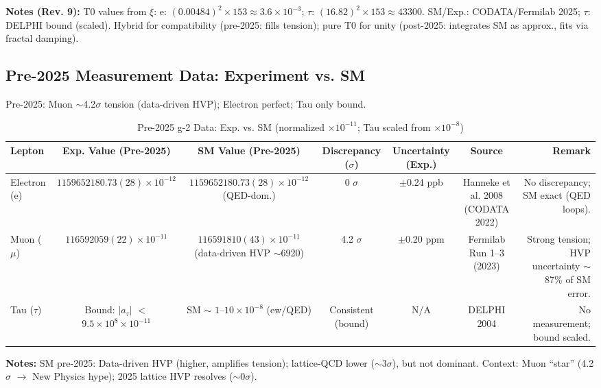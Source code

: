 \documentclass[12pt,a4paper]{article}
\theoremstyle{definition}
\begin{document}
	\textbf{Notes (Rev. 9):} T0 values from $\xi$: e: $(0.00484)^2 \times 153 \approx 3.6 \times 10^{-3}$; $\tau$: $(16.82)^2 \times 153 \approx 43300$. SM/Exp.: CODATA/Fermilab 2025; $\tau$: DELPHI bound (scaled). Hybrid for compatibility (pre-2025: fills tension); pure T0 for unity (post-2025: integrates SM as approx., fits via fractal damping).
	
	\subsection{Pre-2025 Measurement Data: Experiment vs. SM}
	
	Pre-2025: Muon $\sim$4.2$\sigma$ tension (data-driven HVP); Electron perfect; Tau only bound.
	
	\begin{table}[ht!]
		\centering
		\small
		\begin{adjustbox}{max width=\textwidth}
			\begin{tabular}{@{}lcccccr@{}}
				\toprule
				Lepton & Exp. Value (Pre-2025) & SM Value (Pre-2025) & Discrepancy ($\sigma$) & Uncertainty (Exp.) & Source & Remark \\
				\midrule
				Electron (e) & $1159652180.73(28) \times 10^{-12}$ & $1159652180.73(28) \times 10^{-12}$ (QED-dom.) & 0 $\sigma$ & $\pm$0.24 ppb & Hanneke et al. 2008 (CODATA 2022) & No discrepancy; SM exact (QED loops). \\
				Muon ($\mu$) & $116592059(22) \times 10^{-11}$ & $116591810(43) \times 10^{-11}$ (data-driven HVP $\sim$6920) & 4.2 $\sigma$ & $\pm$0.20 ppm & Fermilab Run 1--3 (2023) & Strong tension; HVP uncertainty $\sim$87\% of SM error. \\
				Tau ($\tau$) & Bound: $|a_\tau|$ $<$ $9.5 \times 10^{8} \times 10^{-11}$ & SM $\sim$ $1$--$10 \times 10^{-8}$ (ew/QED) & Consistent (bound) & N/A & DELPHI 2004 & No measurement; bound scaled. \\
				\bottomrule
			\end{tabular}
		\end{adjustbox}
		\caption{Pre-2025 g-2 Data: Exp. vs. SM (normalized $ \times 10^{-11}$; Tau scaled from $ \times 10^{-8}$)}
		\label{tab:pre2025}
	\end{table}
	
	\textbf{Notes:} SM pre-2025: Data-driven HVP (higher, amplifies tension); lattice-QCD lower ($\sim$3$\sigma$), but not dominant. Context: Muon ``star'' (4.2$\sigma$ $\to$ New Physics hype); 2025 lattice HVP resolves ($\sim$0$\sigma$).
	
\end{document}
